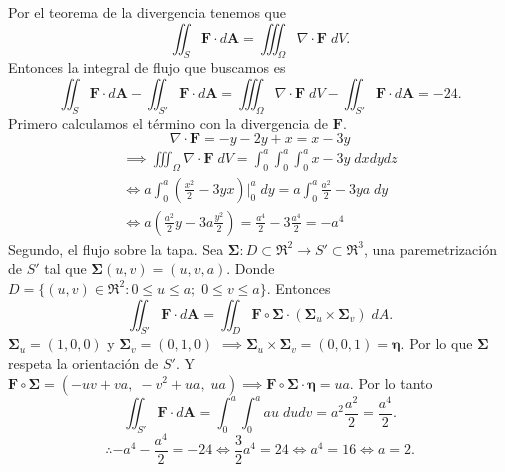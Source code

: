 \begin{solution}
    
    Por el teorema de la divergencia tenemos que
    \[
    \iint_S \mathbf{F}\cdot d\mathbf{A}=\iiint_\Omega \nabla \cdot \mathbf{F}\;dV.
    \]
    Entonces la integral de flujo que buscamos es
    \[
    \iint_S \mathbf{F}\cdot d\mathbf{A} - \iint_{S'} \mathbf{F}\cdot d\mathbf{A}=
    \iiint_\Omega \nabla \cdot \mathbf{F}\;dV - \iint_{S'} \mathbf{F}\cdot d\mathbf{A}=-24.
    \]
    Primero calculamos el t\'ermino con la divergencia de $\mathbf{F}$.
    \[
    \nabla\cdot\mathbf{F}=-y-2y+x=x-3y
    \]
    \begin{gather*}
    \implies\iiint_\Omega\nabla\cdot\mathbf{F}\;dV=\int_0^a \int_0^a \int_0^a x-3y\;dxdydz\\[.2cm]
    \iff a\int_0^a \left(\frac{x^2}{2}-3yx\right)\Bigg|_0^a\;dy=a\int_0^a \frac{a^2}{2}-3ya\;dy\\[.2cm]
    \iff a\left( \frac{a^2}{2}y-3a\frac{y^2}{2} \right)=\frac{a^4}{2}-3\frac{a^4}{2}=-a^4
    \end{gather*}
    Segundo, el flujo sobre la tapa. Sea $\boldsymbol{\Sigma} : D\subset\Re^2\to S'\subset\Re^3$, una paremetrizaci\'on de $S'$ tal que $\boldsymbol{\Sigma}(u,v)=(u,v,a)$. Donde $D = \{(u,v)\in\Re^2:0\leq u\leq a;\;0\leq v \leq a\}$. Entonces
    \[
    \iint_{S'} \mathbf{F}\cdot d\mathbf{A}=\iint_D \mathbf{F}\circ\boldsymbol{\Sigma} \cdot (\boldsymbol{\Sigma}_u\times\boldsymbol{\Sigma}_v)\;dA.
    \]
    $\boldsymbol{\Sigma}_u=(1,0,0)$ y $\boldsymbol{\Sigma}_v=(0,1,0)$ $\implies \boldsymbol{\Sigma}_u\times\boldsymbol{\Sigma}_v=(0,0,1)=\boldsymbol{\eta}$. Por lo que $\boldsymbol{\Sigma}$ respeta la orientaci\'on de $S'$. Y $\mathbf{F}\circ\boldsymbol{\Sigma}=(-uv+va,\;-v^2+ua,\;ua) \implies \mathbf{F}\circ\boldsymbol{\Sigma}\cdot\boldsymbol{\eta}=ua$. Por lo tanto
    \[
    \iint_{S'} \mathbf{F}\cdot d\mathbf{A}=\int_0^a\int_0^a au\;dudv=a^2\frac{a^2}{2}=\frac{a^4}{2}.
    \]
    \[
    \therefore -a^4-\frac{a^4}{2}=-24\iff \frac{3}{2}a^4=24\iff a^4=16 \iff a=2.
    \]
    
\end{solution}


